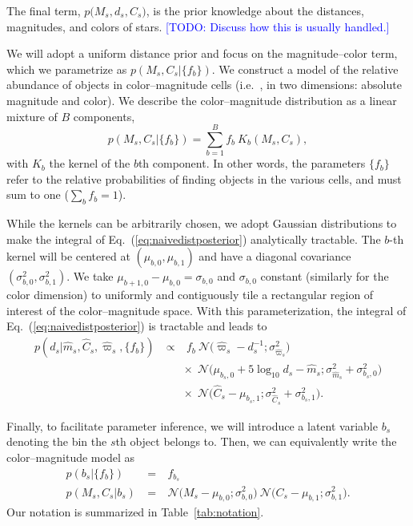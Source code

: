 \documentclass[manuscript, letterpaper]{aastex6}
\newcommand{\ie}{{{i.e.}~}}
\newcommand{\equref}[1]{{\xspace}Eq.~(\ref{#1})}
\newcommand{\equ}[1]{\begin{equation}#1\end{equation}}
\newcommand{\eqn}[1]{\begin{eqnarray}#1\end{eqnarray}}
\newcommand{\todo}[1]{\textcolor{blue}{[TODO: #1]}}
\begin{document}
The final term, $ p\bigl( M_s, d_s, C_s \bigr) $, is the prior knowledge about the distances, magnitudes, and colors of stars. 
\todo{Discuss how this is usually handled.}

We will adopt a uniform distance prior and focus on the magnitude--color term, which we parametrize as $p\left(M_s, C_s  \bigr\rvert \{ f_{b} \} \right) $.
We construct a model of the relative abundance of objects in color--magnitude cells (\ie, in two dimensions: absolute magnitude and color).
We describe the color--magnitude distribution as a linear mixture of $B$ components,
\equ{
	p\left(M_s, C_s  \bigr\rvert \{ f_{b} \} \right) = \sum_{b=1}^B f_b \ K_b(M_s, C_s),
} 
with $K_b$ the kernel of the $b$th component. 
In other words, the parameters $\{ f_{b} \}$ refer to the relative probabilities of finding objects in the various cells, and must sum to one ($\sum_b f_b = 1$).

While the kernels can be arbitrarily chosen, we adopt Gaussian distributions to make the integral of \equref{eq:naivedistposterior} analytically tractable.
The $b$-th kernel will be centered at $(\mu_{b,0}, \mu_{b,1})$ and have a diagonal covariance $(\sigma_{b,0}^2, \sigma_{b,1}^2)$.
We take $\mu_{b+1,0}-\mu_{b,0} = \sigma_{b,0}$ and $\sigma_{b,0}$ constant (similarly for the color dimension) to uniformly and contiguously tile a rectangular region of interest of the color--magnitude space. 
With this parameterization, the integral of \equref{eq:naivedistposterior} is tractable and leads to
\eqn{
	p(d_s | \hat{m}_s, \hat{C}_s, \hat{\varpi}_s, \{ f_{b} \})  \ &\propto&  \ f_b \ \mathcal{N}\bigl(\hat{\varpi}_s - d_s^{-1};\sigma_{\hat{\varpi}_s}^2 \bigr) \\ 
	&&\times \ \ \mathcal{N}\bigl( \mu_{b_s,0} + 5\log_{10}d_s  -\hat{m}_s ;\sigma_{\hat{m}_s}^2 + \sigma_{b_s,0}^2 \bigr) \nonumber\\ 
	&&\times \ \ \mathcal{N}\bigl(\hat{C}_s - \mu_{b_s,1};\sigma_{\hat{C}_s}^2 + \sigma_{b_s,1}^2 \bigr). \label{eq:distposterior}\nonumber
}

Finally, to facilitate parameter inference, we will introduce a latent variable $b_s$ denoting the bin the $s$th object belongs to.
Then, we can equivalently write the color--magnitude model as
\eqn{
	p\left(b_s \bigr\rvert \bigl\{ f_b \bigr\}\right) \ &=& \ f_{b_s} \\ 
	p\left(M_s, C_s \bigr\rvert b_s \right) \ &=& \ \mathcal{N}\bigl(M_s - \mu_{b,0};\sigma_{b,0}^2 \bigr)  \ \mathcal{N}\bigl(C_s - \mu_{b,1};\sigma_{b,1}^2 \bigr).\nonumber
}
Our notation is summarized in Table~\ref{tab:notation}.
\end{document}
